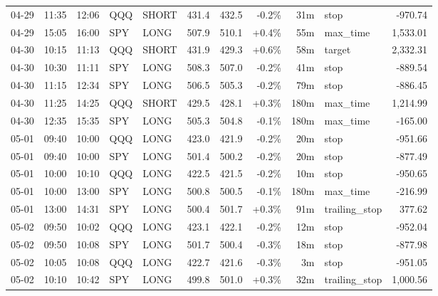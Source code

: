 \documentclass[11pt,a4paper,twoside]{article}
\begin{document}
\begin{center}
\begin{longtable}{>{\color{txtmain}}l l l l l r r r r >{\color{txtmain}}l r}
04-29 & 11:35 & 12:06 & QQQ & SHORT & 431.4 & 432.5 & \textcolor{lossred}{-0.2\%} & 31m & stop & \textcolor{lossred}{-970.74} \\
04-29 & 15:05 & 16:00 & SPY & LONG & 507.9 & 510.1 & \textcolor{wingreen}{+0.4\%} & 55m & max\_time & \textcolor{wingreen}{1,533.01} \\
04-30 & 10:15 & 11:13 & QQQ & SHORT & 431.9 & 429.3 & \textcolor{wingreen}{+0.6\%} & 58m & target & \textcolor{wingreen}{2,332.31} \\
04-30 & 10:30 & 11:11 & SPY & LONG & 508.3 & 507.0 & \textcolor{lossred}{-0.2\%} & 41m & stop & \textcolor{lossred}{-889.54} \\
04-30 & 11:15 & 12:34 & SPY & LONG & 506.5 & 505.3 & \textcolor{lossred}{-0.2\%} & 79m & stop & \textcolor{lossred}{-886.45} \\
04-30 & 11:25 & 14:25 & QQQ & SHORT & 429.5 & 428.1 & \textcolor{wingreen}{+0.3\%} & 180m & max\_time & \textcolor{wingreen}{1,214.99} \\
04-30 & 12:35 & 15:35 & SPY & LONG & 505.3 & 504.8 & \textcolor{lossred}{-0.1\%} & 180m & max\_time & \textcolor{lossred}{-165.00} \\
05-01 & 09:40 & 10:00 & QQQ & LONG & 423.0 & 421.9 & \textcolor{lossred}{-0.2\%} & 20m & stop & \textcolor{lossred}{-951.66} \\
05-01 & 09:40 & 10:00 & SPY & LONG & 501.4 & 500.2 & \textcolor{lossred}{-0.2\%} & 20m & stop & \textcolor{lossred}{-877.49} \\
05-01 & 10:00 & 10:10 & QQQ & LONG & 422.5 & 421.5 & \textcolor{lossred}{-0.2\%} & 10m & stop & \textcolor{lossred}{-950.65} \\
05-01 & 10:00 & 13:00 & SPY & LONG & 500.8 & 500.5 & \textcolor{lossred}{-0.1\%} & 180m & max\_time & \textcolor{lossred}{-216.99} \\
05-01 & 13:00 & 14:31 & SPY & LONG & 500.4 & 501.7 & \textcolor{wingreen}{+0.3\%} & 91m & trailing\_stop & \textcolor{wingreen}{377.62} \\
05-02 & 09:50 & 10:02 & QQQ & LONG & 423.1 & 422.1 & \textcolor{lossred}{-0.2\%} & 12m & stop & \textcolor{lossred}{-952.04} \\
05-02 & 09:50 & 10:08 & SPY & LONG & 501.7 & 500.4 & \textcolor{lossred}{-0.3\%} & 18m & stop & \textcolor{lossred}{-877.98} \\
05-02 & 10:05 & 10:08 & QQQ & LONG & 422.7 & 421.6 & \textcolor{lossred}{-0.3\%} & 3m & stop & \textcolor{lossred}{-951.05} \\
05-02 & 10:10 & 10:42 & SPY & LONG & 499.8 & 501.0 & \textcolor{wingreen}{+0.3\%} & 32m & trailing\_stop & \textcolor{wingreen}{1,000.56} \\

\end{longtable}
\end{center}
\end{document}
